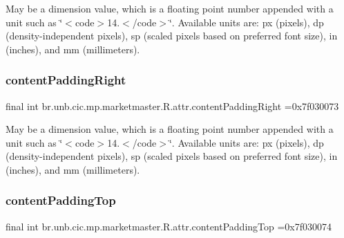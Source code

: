 May be a dimension value, which is a floating point number appended with a unit such as \char`\"{}$<$code$>$14.\+5sp$<$/code$>$\char`\"{}. Available units are\+: px (pixels), dp (density-\/independent pixels), sp (scaled pixels based on preferred font size), in (inches), and mm (millimeters). \mbox{\label{classbr_1_1unb_1_1cic_1_1mp_1_1marketmaster_1_1R_1_1attr_a02fa49d6482d3beca07948544c9412dc}} 
\subsubsection{\texorpdfstring{content\+Padding\+Right}{contentPaddingRight}}
{\footnotesize\ttfamily final int br.\+unb.\+cic.\+mp.\+marketmaster.\+R.\+attr.\+content\+Padding\+Right =0x7f030073\hspace{0.3cm}{\ttfamily [static]}}

May be a dimension value, which is a floating point number appended with a unit such as \char`\"{}$<$code$>$14.\+5sp$<$/code$>$\char`\"{}. Available units are\+: px (pixels), dp (density-\/independent pixels), sp (scaled pixels based on preferred font size), in (inches), and mm (millimeters). \mbox{\label{classbr_1_1unb_1_1cic_1_1mp_1_1marketmaster_1_1R_1_1attr_a96692815209f786ff5f3b981dfa4a3bc}} 
\subsubsection{\texorpdfstring{content\+Padding\+Top}{contentPaddingTop}}
{\footnotesize\ttfamily final int br.\+unb.\+cic.\+mp.\+marketmaster.\+R.\+attr.\+content\+Padding\+Top =0x7f030074\hspace{0.3cm}{\ttfamily [static]}}

